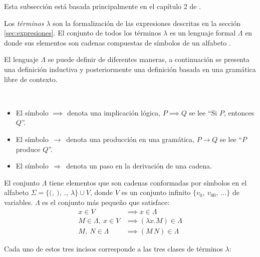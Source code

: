 Esta subsección está basada principalmente en el capítulo 2 de \cite{Barendregt:Bible}.

Los \emph{términos \( λ \)} son la formalización de las expresiones descritas en la sección \ref{sec:expresiones}. El conjunto de todos los términos \( λ \) es un lenguaje formal \( Λ \) en donde sus elementos son cadenas compuestas de símbolos de un alfabeto \cite{Hopcroft:Automata}.

El lenguaje \( Λ \) se puede definir de diferentes maneras, a continuación se presenta una definición inductiva y posteriormente una definición basada en una gramática libre de contexto.

\begin{rem}[Notación]\
  \begin{itemize}
  \item El símbolo \( \implies \) denota una implicación lógica, \( P \implies Q \) se lee ``Si \( P \), entonces \( Q \)''.
  \item El símbolo \( \, \longrightarrow\, \) denota una producción en una gramática, \( P \longrightarrow Q \) se lee ``\( P \) produce \( Q \)''.
  \item El símbolo \( \, \Rightarrow\, \) denota un paso en la derivación de una cadena.
  \end{itemize}
\end{rem}

\begin{defn}[Términos \( λ \)]
  El conjunto \( Λ \) tiene elementos que son cadenas conformadas por símbolos en el alfabeto \( Σ=\{\mathtt{(},\ \mathtt{)},\ \mathtt{.},\ λ\} \cup V \), donde \( V \) es un conjunto infinito \( \{v_{0},\ v_{00},\ ... \} \) de variables. \( Λ \) es el conjunto más pequeño que satisface:
  \label{defn:terminos}
  \begin{subequations}
    \begin{align}
      \label{terminos:atomos} \tag{a}
      x \in V & \implies x \in Λ \\
      \label{terminos:abstracciones} \tag{b}
      M \in Λ,\ x \in V & \implies (λx.M) \in Λ \\
      \label{terminos:aplicaciones} \tag{c}
      M,\ N \in Λ & \implies (M\, N) \in Λ
    \end{align}
  \end{subequations}
\end{defn}

Cada uno de estos tres incisos corresponde a las tres clases de términos \( λ \):

